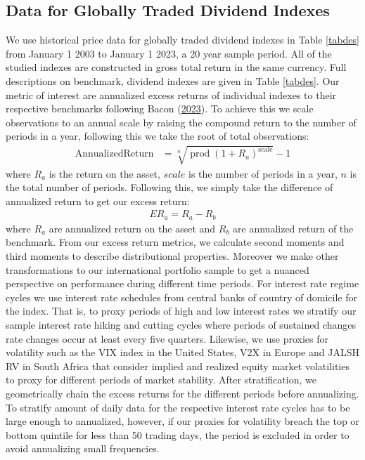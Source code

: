 \documentclass[11pt,preprint, authoryear]{elsarticle}
\numberwithin{equation}{section}
\numberwithin{figure}{section}
\numberwithin{table}{section}
\begin{document}
\hypertarget{data-for-globally-traded-dividend-indexes}{%
\subsection{\texorpdfstring{Data for Globally Traded Dividend
Indexes\label{int}}{Data for Globally Traded Dividend Indexes}}\label{data-for-globally-traded-dividend-indexes}}

We use historical price data for globally traded dividend indexes in
Table \ref{tabdes} from January 1 2003 to January 1 2023, a 20 year
sample period. All of the studied indexes are constructed in gross total
return in the same currency. Full descriptions on benchmark, dividend
indexes are given in Table \ref{tabdes}. Our metric of interest are
annualized excess returns of individual indexes to their respective
benchmarks following Bacon
(\protect\hyperlink{ref-bacon2023practical}{2023}). To achieve this we
scale observations to an annual scale by raising the compound return to
the number of periods in a year, following this we take the root of
total observations: \begin{align*}
\operatorname{Annualized Return} & = \sqrt[n]{\operatorname{prod}\left(1+R_a\right)^{\operatorname{scale}}} - 1
\end{align*} where \(R_a\) is the return on the asset, \(scale\) is the
number of periods in a year, \(n\) is the total number of periods.
Following this, we simply take the difference of annualized return to
get our excess return: \begin{align*}
E R_a = R_{a} - R_{b}
\end{align*} where \(R_{a}\) are annualized return on the asset and
\(R_{b}\) are annualized return of the benchmark. From our excess return
metrics, we calculate second moments and third moments to describe
distributional properties. Moreover we make other transformations to our
international portfolio sample to get a nuanced perspective on
performance during different time periods. For interest rate regime
cycles we use interest rate schedules from central banks of country of
domicile for the index. That is, to proxy periods of high and low
interest rates we stratify our sample interest rate hiking and cutting
cycles where periods of sustained changes rate changes occur at least
every five quarters. Likewise, we use proxies for volatility such as the
VIX index in the United States, V2X in Europe and JALSH RV in South
Africa that consider implied and realized equity market volatilities to
proxy for different periods of market stability. After stratification,
we geometrically chain the excess returns for the different periods
before annualizing. To stratify amount of daily data for the respective
interest rate cycles has to be large enough to annualized, however, if
our proxies for volatility breach the top or bottom quintile for less
than 50 trading days, the period is excluded in order to avoid
annualizing small frequencies.
\end{document}

